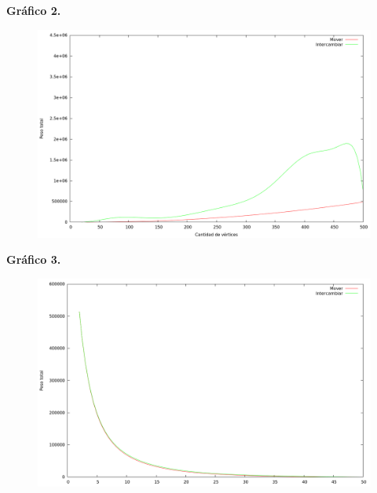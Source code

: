\textbf{Gráfico 2.}
\begin{figure}[H]
  \begin{center}
    \includegraphics[scale=0.35]{imagenes/local-random-n-peso.png}
  \end{center}
\end{figure}

\vspace*{0.5cm}

\textbf{Gráfico 3.}
\begin{figure}[H]
  \begin{center}
    \includegraphics[scale=0.35]{imagenes/local-goloso-k-peso.png}
  \end{center}
\end{figure}

\newpage

